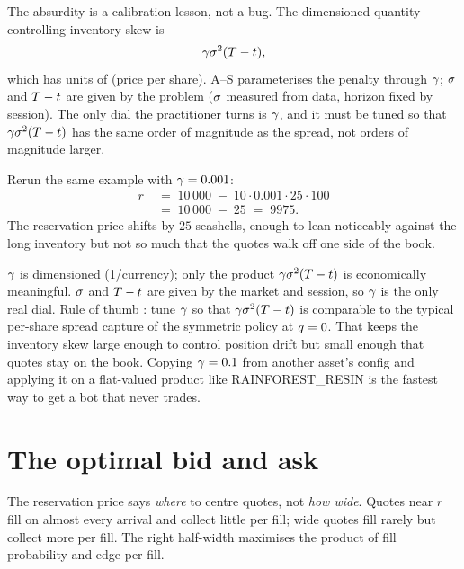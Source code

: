 The absurdity is a calibration lesson, not a bug. The dimensioned
quantity controlling inventory skew is
\begin{equation}
  \gamma \sigma^2 (T - t),
\end{equation}
which has units of (price per share). A--S parameterises the
penalty through $\gamma$; $\sigma$ and $T - t$ are given by the
problem ($\sigma$ measured from data, horizon fixed by session). The
only dial the practitioner turns is $\gamma$, and it must be tuned
so that $\gamma \sigma^2 (T - t)$ has the same order of
magnitude as the spread, not orders of magnitude larger.

Rerun the same example with $\gamma = 0.001$:
\begin{align}
  r \;&=\; 10\,000 \;-\; 10 \cdot 0.001 \cdot 25 \cdot 100
  \nonumber\\
  \;&=\; 10\,000 \;-\; 25
  \;=\; 9975.
  \label{eq:ch8_r_good}
\end{align}
The reservation price shifts by $25$ seashells, enough to lean
noticeably against the long inventory but not so much that the
quotes walk off one side of the book.

\begin{pitfallbox}
$\gamma$ is dimensioned (1/currency); only the product
$\gamma \sigma^2 (T - t)$ is economically meaningful.
$\sigma$ and $T - t$ are given by the market and session, so
$\gamma$ is the only real dial. Rule of thumb
\citep{hummingbotASguide}: tune $\gamma$ so that
$\gamma \sigma^2 (T - t)$ is comparable to the typical
per-share spread capture of the symmetric policy at $q = 0$.
That keeps the inventory skew large enough to control position
drift but small enough that quotes stay on the book. Copying
$\gamma = 0.1$ from another asset's config and applying it on a
flat-valued product like RAINFOREST\_RESIN is the fastest way to get
a bot that never trades.
\end{pitfallbox}

\section{The optimal bid and ask}
\label{sec:ch8_spread}

The reservation price says \emph{where} to centre quotes, not
\emph{how wide}. Quotes near $r$ fill on almost every arrival and
collect little per fill; wide quotes fill rarely but collect more
per fill. The right half-width maximises the product of fill
probability and edge per fill.

